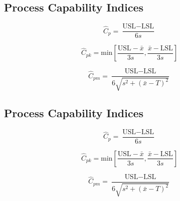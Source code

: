 \documentclass[a4paper,12pt]{article}
\begin{document}
\Large{
\subsection*{Process Capability Indices}
\[ \hat{C}_p = \frac{\mbox{USL} - \mbox{LSL}}{6s}\]

\[ \hat{C}_{pk} = \mbox{min} \left[\frac{\mbox{USL} - \bar{x}}{3s},\frac{\bar{x} - \mbox{LSL}}{3s} \right] \]

\[ \hat{C}_{pm} = \frac{\mbox{USL} - \mbox{LSL}}{6\sqrt{s^2+(\bar{x}-T)^2}}\]
\bigskip
%
\subsection*{Process Capability Indices}
\begin{multicols}{2}
\[ \hat{C}_p = \frac{\mbox{USL} - \mbox{LSL}}{6s}\]

\[ \hat{C}_{pk} = \mbox{min} \left[\frac{\mbox{USL} - \bar{x}}{3s},\frac{\bar{x} - \mbox{LSL}}{3s} \right] \]

\[ \hat{C}_{pm} = \frac{\mbox{USL} - \mbox{LSL}}{6\sqrt{s^2+(\bar{x}-T)^2}}\]
\end{multicols}
	\newpage
	
	\Large{
}}
\end{document}

